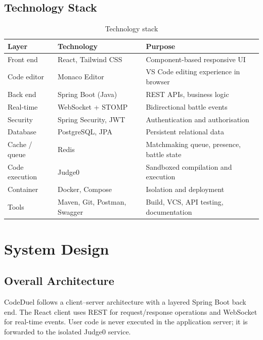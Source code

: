 \documentclass[12pt,a4paper,oneside]{report}
\begin{document}
\section{Technology Stack}
\begin{table}[H]
\centering
\small
\begin{tabularx}{\textwidth}{@{}llX@{}}
\toprule
\textbf{Layer} & \textbf{Technology} & \textbf{Purpose} \\
\midrule
Front end       & React, Tailwind CSS & Component-based responsive UI \\
Code editor     & Monaco Editor       & VS Code editing experience in browser \\
Back end        & Spring Boot (Java)  & REST APIs, business logic \\
Real-time       & WebSocket + STOMP   & Bidirectional battle events \\
Security        & Spring Security, JWT& Authentication and authorisation \\
Database        & PostgreSQL, JPA     & Persistent relational data \\
Cache / queue   & Redis               & Matchmaking queue, presence, battle state \\
Code execution  & Judge0              & Sandboxed compilation and execution \\
Container       & Docker, Compose     & Isolation and deployment \\
Tools           & Maven, Git, Postman, Swagger & Build, VCS, API testing, documentation \\
\bottomrule
\end{tabularx}
\caption{Technology stack}
\end{table}

\chapter{System Design}
\section{Overall Architecture}
CodeDuel follows a client--server architecture with a layered Spring Boot back end. The React client uses
REST for request/response operations and WebSocket for real-time events. User code is never executed in the
application server; it is forwarded to the isolated Judge0 service.
\end{document}
